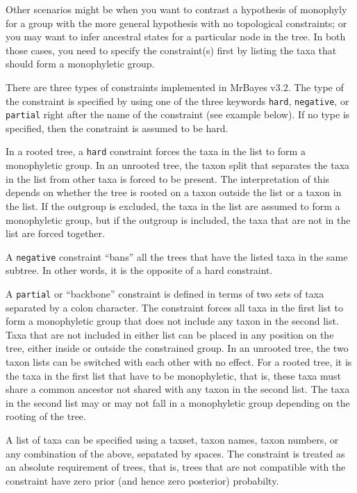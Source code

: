 \documentclass[12pt]{book}
\newcommand{\ttt}[1]{\texttt{#1}}
\begin{document}
Other scenarios might be when you want to contrast a hypothesis of monophyly for a group with the
more general hypothesis with no topological constraints; or you may want to infer ancestral states
for a particular node in the tree. In both those cases, you need to specify the constraint(s) first
by listing the taxa that should form a monophyletic group.

There are three types of constraints implemented in MrBayes v3.2. The type of the constraint is
specified by using one of the three keywords \ttt{hard}, \ttt{negative}, or \ttt{partial} right
after the name of the constraint (see example below). If no type is specified, then the constraint
is assumed to be hard.

In a rooted tree, a \ttt{hard} constraint forces the taxa in the list to form a monophyletic group.
In an unrooted tree, the taxon split that separates the taxa in the list from other taxa is forced
to be present. The interpretation of this depends on whether the tree is rooted on a taxon outside
the list or a taxon in the list. If the outgroup is excluded, the taxa in the list are assumed to
form a monophyletic group, but if the outgroup is included, the taxa that are not in the list are
forced together.

A \ttt{negative} constraint ``bans'' all the trees that have the listed taxa in the same subtree.
In other words, it is the opposite of a hard constraint.

A \ttt{partial} or ``backbone'' constraint is defined in terms of two sets of taxa separated by a
colon character. The constraint forces all taxa in the first list to form a monophyletic group that
does not include any taxon in the second list. Taxa that are not included in either list can be
placed in any position on the tree, either inside or outside the constrained group. In an unrooted
tree, the two taxon lists can be switched with each other with no effect. For a rooted tree, it is
the taxa in the first list that have to be monophyletic, that is, these taxa must share a common
ancestor not shared with any taxon in the second list. The taxa in the second list may or may not
fall in a monophyletic group depending on the rooting of the tree.

A list of taxa can be specified using a taxset, taxon names, taxon numbers, or any combination of
the above, sepatated by spaces. The constraint is treated as an absolute requirement of trees, that
is, trees that are not compatible with the constraint have zero prior (and hence zero posterior)
probabilty.
\end{document}
